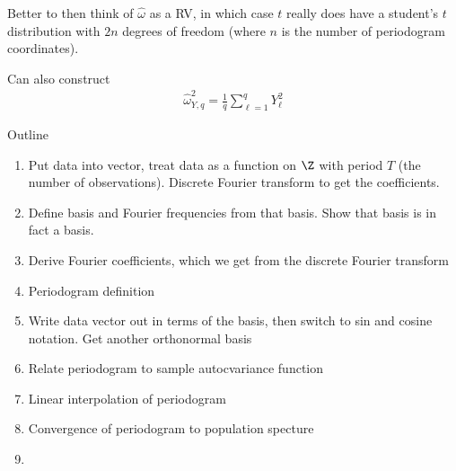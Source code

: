 \documentclass[12pt]{article}
\theoremstyle{plain}
\theoremstyle{definition}
\theoremstyle{remark}
\begin{document}
Better to then think of $\hat{\omega}$ as a RV, in which case $t$ really
does have a student's $t$ distribution with $2n$ degrees of freedom
(where $n$ is the number of periodogram coordinates).

Can also construct
\begin{align*}
  \hat{\omega}_{Y,q}^2
  =
  \frac{1}{q}
  \sum_{\ell=1}^q Y_\ell^2
\end{align*}


\clearpage
Outline
\begin{enumerate}
  \item
    Put data into vector, treat data as a function on $\Z$ with
    period $T$ (the number of observations).
    Discrete Fourier transform to get the coefficients.

  \item Define basis and Fourier frequencies from that basis.
    Show that basis is in fact a basis.

  \item Derive Fourier coefficients, which we get from the discrete
    Fourier transform

  \item Periodogram definition
  \item Write data vector out in terms of the basis, then switch to sin
    and cosine notation.
    Get another orthonormal basis
  \item Relate periodogram to sample autocvariance function
  \item Linear interpolation of periodogram
  \item Convergence of periodogram to population specture
  \item
\end{enumerate}
\end{document}
